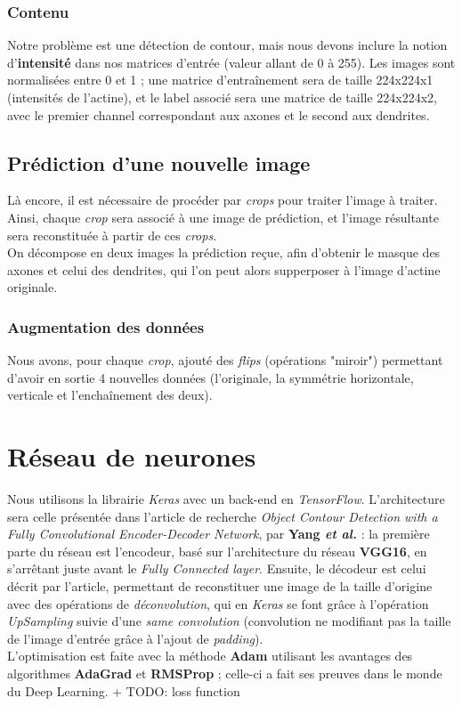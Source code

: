 \documentclass{report}
\begin{document}
\subsection{Contenu}

Notre problème est une détection de contour, mais nous devons inclure la notion
d'\textbf{intensité} dans nos matrices d'entrée (valeur allant de 0 à 255).
Les images sont normalisées entre 0 et 1 ; une matrice d'entraînement sera de
taille 224x224x1 (intensités de l'actine), et le label associé sera une matrice
de taille 224x224x2, avec le premier channel correspondant aux axones et le second
aux dendrites.

\section{Prédiction d'une nouvelle image}

Là encore, il est nécessaire de procéder par \textit{crops} pour traiter l'image
à traiter. Ainsi, chaque \textit{crop} sera associé à une image de prédiction,
et l'image résultante sera reconstituée à partir de ces \textit{crops}. \\
On décompose en deux images la prédiction reçue, afin d'obtenir le masque des axones
et celui des dendrites, qui l'on peut alors supperposer à l'image d'actine originale.

\subsection{Augmentation des données}

Nous avons, pour chaque \textit{crop}, ajouté des \textit{flips} (opérations "miroir")
permettant d'avoir en sortie 4 nouvelles données (l'originale, la symmétrie horizontale,
verticale et l'enchaînement des deux).


\chapter{Réseau de neurones}

Nous utilisons la librairie \textit{Keras} avec un back-end en \textit{TensorFlow}.
L'architecture sera celle présentée dans l'article de recherche \textit{Object Contour
Detection with a Fully Convolutional Encoder-Decoder Network}, par \textbf{Yang
\textit{et al.}} : la première parte du réseau est l'encodeur, basé sur l'architecture
du réseau \textbf{VGG16}, en s'arrêtant juste avant le \textit{Fully Connected layer}.
Ensuite, le décodeur est celui décrit par l'article, permettant de reconstituer
une image de la taille d'origine avec des opérations de \textit{déconvolution},
qui en \textit{Keras} se font grâce à l'opération \textit{UpSampling} suivie d'une
\textit{same convolution} (convolution ne modifiant pas la taille de l'image d'entrée
grâce à l'ajout de \textit{padding}). \\
L'optimisation est faite avec la méthode \textbf{Adam} utilisant les avantages des
algorithmes \textbf{AdaGrad} et \textbf{RMSProp}  ; celle-ci a fait ses preuves
dans le monde du Deep Learning.
+ TODO: loss function
\end{document}
